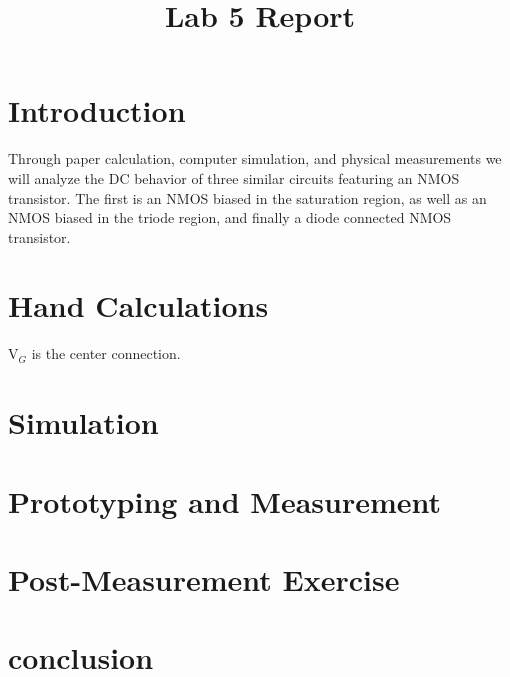 \documentclass{article}
\title{Lab 5 Report}
\begin{document}
\maketitle
\section{Introduction}
Through paper calculation, computer simulation, and physical
measurements we will analyze the DC behavior of three similar 
circuits featuring an NMOS transistor. The first is an NMOS
biased in the saturation region, as well as an NMOS biased in 
the triode region, and finally a diode connected NMOS
transistor. 

\section{Hand Calculations}
V$_G$ is the center connection. 

\section{Simulation}

\section{Prototyping and Measurement}

\section{Post-Measurement Exercise}

\section{conclusion}
\end{document}
